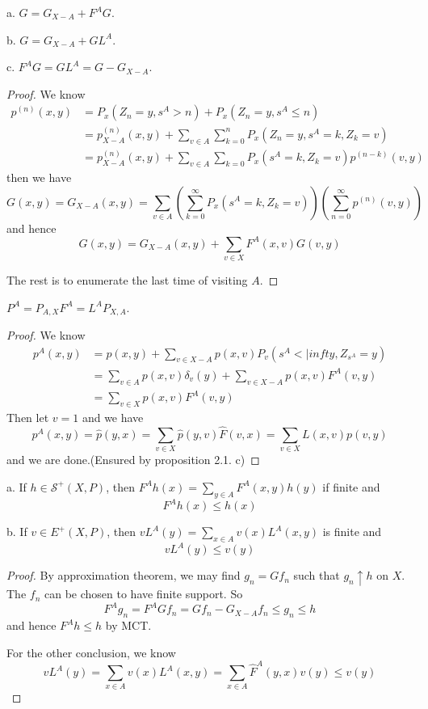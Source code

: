 \documentclass[lang=en,11pt,a4paper,citestyle =authoryear]{elegantpaper}
\newcommand{\Sar}{\mathcal{S}}
\begin{document}
\begin{lemma}
    a. $G = G_{X-A}+F^AG$.\par
    b. $G = G_{X-A} + GL^A$.\par
    c. $F^AG = GL^A  = G-G_{X-A}$.
\end{lemma}
\begin{proof}
    We know
    \[
    \begin{aligned}
    p^{(n)}(x,y) &= P_x(Z_n = y, s^A>n)+P_x(Z_n = y, s^A \leq n)\\
    &= p_{X-A}^{(n)}(x,y) + \sum_{v\in A}\sum\limits_{k=0}^n P_x(Z_n = y, s^A = k, Z_k = v) \\
    & = p_{X-A}^{(n)}(x,y) + \sum_{v\in A}\sum\limits_{k=0}P_x(s^A = k,Z_k = v)p^{(n-k)}(v,y)
    \end{aligned}
    \]
    then we have
    \[
    G(x,y) = G_{X-A}(x,y) = \sum\limits_{v\in A}(\sum\limits_{k=0}^{\infty}P_x(s^A = k, Z_k = v))(\sum\limits_{n=0}^{\infty} p^{(n)}(v,y))
    \]
    and hence
    \[
    G(x,y) = G_{X-A}(x,y) + \sum\limits_{v\in X}F^A(x,v)G(v,y)
    \]\par 
    The rest is to enumerate the last time of visiting $A$.
\end{proof}

\begin{lemma}
    $P^A = P_{A,X}F^A = L^AP_{X,A}$.
\end{lemma}
\begin{proof}
    We know
    \[
    \begin{aligned}
        p^A(x,y) &= p(x,y) + \sum_{v\in X-A}p(x,v)P_v(s^A<|infty, Z_{s^A} = y) \\
        &=\sum\limits_{v\in A}p(x,v)\delta_v(y) + \sum\limits_{v\in X-A}p(x,v)F^A(v,y) \\
        &= \sum\limits_{v\in X}p(x,v)F^A(v,y)
    \end{aligned}
    \]
    Then let $v = 1$ and we have
    \[
    p^A(x,y) = \hat{p}(y,x) = \sum_{v\in X}\hat{p}(y,v)\hat{F}(v,x) = \sum\limits_{v\in X} L(x,v)p(v,y) 
    \]
    and we are done.(Ensured by proposition 2.1. c)
\end{proof}

\begin{lemma}
    a. If $h\in\Sar^+(X,P)$, then $F^Ah(x) = \sum_{y\in A} F^A(x,y)h(y)$ if finite and
    \[F^Ah(x) \leq h(x)\]\par
    b. If $v\in E^+(X,P)$, then $vL^A(y) = \sum_{x\in A}v(x)L^A(x,y)$ is finite and
    \[vL^A(y) \leq v(y)\]
\end{lemma}
\begin{proof}
    By approximation theorem, we may find $g_n = Gf_n$ such that $g_n \uparrow h$ on $X$. The $f_n$ can be chosen to have finite support. So
    \[
    F^Ag_n = F^AGf_n = Gf_n - G_{X-A}f_n \leq g_n \leq h
    \]
    and hence $F^Ah \leq h$ by MCT.\par
    For the other conclusion, we know 
    \[
    vL^A(y) = \sum_{x\in A}v(x)L^A(x,y) = \sum_{x\in A}\hat{F}^A(y,x)v(y) \leq v(y)
    \]
\end{proof}
\end{document}
